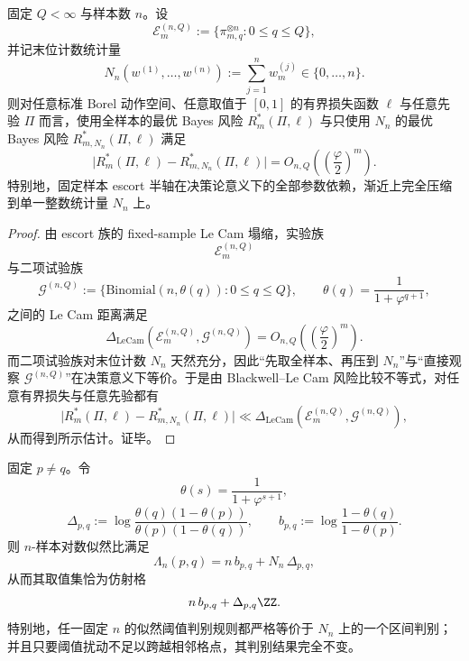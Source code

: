 \begin{theorem}\label{thm:conclusion-fixed-sample-escort-count-shell-sufficiency}
固定 \(Q<\infty\) 与样本数 \(n\)。设
\[
\mathcal E_m^{(n,Q)}:=\{\pi_{m,q}^{\otimes n}:0\le q\le Q\},
\]
并记末位计数统计量
\[
N_n(w^{(1)},\dots,w^{(n)}):=\sum_{j=1}^{n}w_m^{(j)}\in\{0,\dots,n\}.
\]
则对任意标准 Borel 动作空间、任意取值于 \([0,1]\) 的有界损失函数 \(\ell\) 与任意先验 \(\Pi\) 而言，使用全样本的最优 Bayes 风险 \(R_m^\ast(\Pi,\ell)\) 与只使用 \(N_n\) 的最优 Bayes 风险 \(R_{m,N_n}^\ast(\Pi,\ell)\) 满足
\[
\bigl|R_m^\ast(\Pi,\ell)-R_{m,N_n}^\ast(\Pi,\ell)\bigr|
=
O_{n,Q}\!\left(\left(\frac{\varphi}{2}\right)^m\right).
\]
特别地，固定样本 escort 半轴在决策论意义下的全部参数依赖，渐近上完全压缩到单一整数统计量 \(N_n\) 上。
\end{theorem}

\begin{proof}
由 escort 族的 fixed-sample Le Cam 塌缩，实验族
\[
\mathcal E_m^{(n,Q)}
\]
与二项试验族
\[
\mathcal G^{(n,Q)}:=\{\mathrm{Binomial}(n,\theta(q)):0\le q\le Q\},
\qquad
\theta(q)=\frac{1}{1+\varphi^{q+1}},
\]
之间的 Le Cam 距离满足
\[
\Delta_{\mathrm{LeCam}}(\mathcal E_m^{(n,Q)},\mathcal G^{(n,Q)})
=
O_{n,Q}\!\left(\left(\frac{\varphi}{2}\right)^m\right).
\]
而二项试验族对末位计数 \(N_n\) 天然充分，因此“先取全样本、再压到 \(N_n\)”与“直接观察 \(\mathcal G^{(n,Q)}\)”在决策意义下等价。于是由 Blackwell--Le Cam 风险比较不等式，对任意有界损失与任意先验都有
\[
\bigl|R_m^\ast(\Pi,\ell)-R_{m,N_n}^\ast(\Pi,\ell)\bigr|
\ll
\Delta_{\mathrm{LeCam}}(\mathcal E_m^{(n,Q)},\mathcal G^{(n,Q)}),
\]
从而得到所示估计。证毕。
\end{proof}

\begin{proposition}[对数似然的格量子化]\label{prop:conclusion-loglikelihood-affine-lattice-quantization}
固定 \(p\neq q\)。令
\[
\theta(s)=\frac{1}{1+\varphi^{s+1}},
\]
\[
\Delta_{p,q}:=
\log\frac{\theta(q)(1-\theta(p))}{\theta(p)(1-\theta(q))},
\qquad
b_{p,q}:=
\log\frac{1-\theta(q)}{1-\theta(p)}.
\]
则 \(n\)-样本对数似然比满足
\[
\Lambda_n(p,q)=n\,b_{p,q}+N_n\,\Delta_{p,q},
\]
从而其取值集恰为仿射格
\[
n\,b_{p,q}+\Delta_{p,q}\ZZ.
\]
特别地，任一固定 \(n\) 的似然阈值判别规则都严格等价于 \(N_n\) 上的一个区间判别；并且只要阈值扰动不足以跨越相邻格点，其判别结果完全不变。
\end{proposition}

